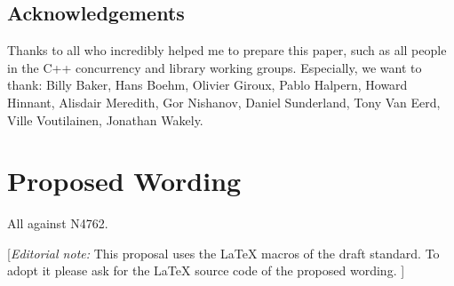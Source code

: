 \subsection*{Acknowledgements}

Thanks to all who incredibly helped me to prepare this paper,
such as all people in the C++ concurrency and library working groups.
Especially, we want to thank:
 Billy Baker, Hans Boehm, Olivier Giroux, Pablo Halpern, Howard Hinnant, Alisdair Meredith, Gor Nishanov,
 Daniel Sunderland, Tony Van Eerd, Ville Voutilainen, Jonathan Wakely.

\section*{Proposed Wording}
All against N4762.

{\color{blue}
[{\itshape{}Editorial note:} This proposal uses the LaTeX macros of the draft standard.
        To adopt it please ask for the LaTeX source code of the proposed wording. ]
}


